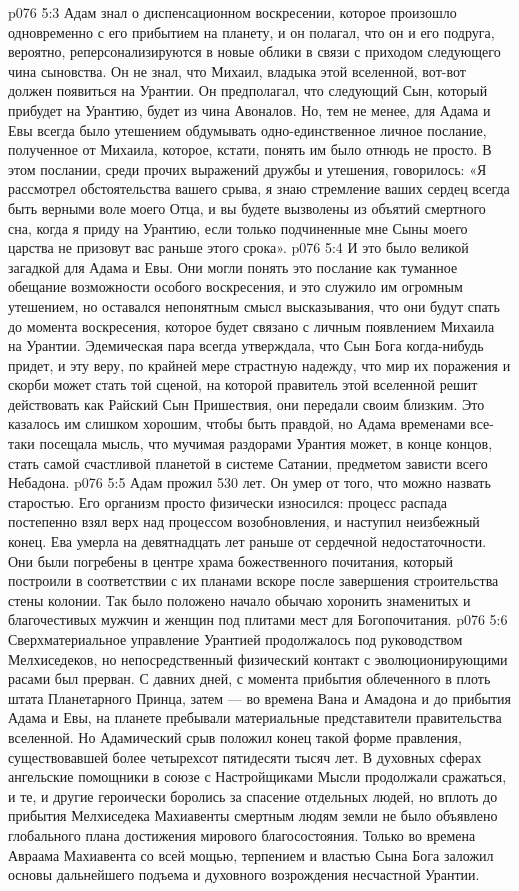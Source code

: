 \vs p076 5:3 \pc Адам знал о диспенсационном воскресении, которое произошло одновременно с его прибытием на планету, и он полагал, что он и его подруга, вероятно, реперсонализируются в новые облики в связи с приходом следующего чина сыновства. Он не знал, что Михаил, владыка этой вселенной, вот\hyp{}вот должен появиться на Урантии. Он предполагал, что следующий Сын, который прибудет на Урантию, будет из чина Авоналов. Но, тем не менее, для Адама и Евы всегда было утешением обдумывать одно\hyp{}единственное личное послание, полученное от Михаила, которое, кстати, понять им было отнюдь не просто. В этом послании, среди прочих выражений дружбы и утешения, говорилось: «Я рассмотрел обстоятельства вашего срыва, я знаю стремление ваших сердец всегда быть верными воле моего Отца, и вы будете вызволены из объятий смертного сна, когда я приду на Урантию, если только подчиненные мне Сыны моего царства не призовут вас раньше этого срока».
\vs p076 5:4 И это было великой загадкой для Адама и Евы. Они могли понять это послание как туманное обещание возможности особого воскресения, и это служило им огромным утешением, но оставался непонятным смысл высказывания, что они будут спать до момента воскресения, которое будет связано с личным появлением Михаила на Урантии. Эдемическая пара всегда утверждала, что Сын Бога когда\hyp{}нибудь придет, и эту веру, по крайней мере страстную надежду, что мир их поражения и скорби может стать той сценой, на которой правитель этой вселенной решит действовать как Райский Сын Пришествия, они передали своим близким. Это казалось им слишком хорошим, чтобы быть правдой, но Адама временами все\hyp{}таки посещала мысль, что мучимая раздорами Урантия может, в конце концов, стать самой счастливой планетой в системе Сатании, предметом зависти всего Небадона.
\vs p076 5:5 \pc Адам прожил 530 лет. Он умер от того, что можно назвать старостью. Его организм просто физически износился: процесс распада постепенно взял верх над процессом возобновления, и наступил неизбежный конец. Ева умерла на девятнадцать лет раньше от сердечной недостаточности. Они были погребены в центре храма божественного почитания, который построили в соответствии с их планами вскоре после завершения строительства стены колонии. Так было положено начало обычаю хоронить знаменитых и благочестивых мужчин и женщин под плитами мест для Богопочитания.
\vs p076 5:6 \pc Сверхматериальное управление Урантией продолжалось под руководством Мелхиседеков, но непосредственный физический контакт с эволюционирующими расами был прерван. С давних дней, с момента прибытия облеченного в плоть штата Планетарного Принца, затем --- во времена Вана и Амадона и до прибытия Адама и Евы, на планете пребывали материальные представители правительства вселенной. Но Адамический срыв положил конец такой форме правления, существовавшей более четырехсот пятидесяти тысяч лет. В духовных сферах ангельские помощники в союзе с Настройщиками Мысли продолжали сражаться, и те, и другие героически боролись за спасение отдельных людей, но вплоть до прибытия Мелхиседека Махиавенты смертным людям земли не было объявлено глобального плана достижения мирового благосостояния. Только во времена Авраама Махиавента со всей мощью, терпением и властью Сына Бога заложил основы дальнейшего подъема и духовного возрождения несчастной Урантии.
